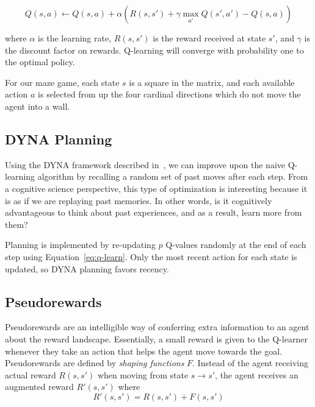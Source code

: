 \documentclass[notitlepage]{article}
\begin{document}
\begin{equation}
Q(s,a) \leftarrow Q(s,a) + \alpha (R(s, s') + \gamma \max_{a'} Q(s', a') - Q(s,a))
\label{eq:q-learn}
\end{equation}

where $\alpha$ is the learning rate, $R(s, s')$ is the reward received at state $s'$, and $\gamma$ is the discount factor on rewards. Q-learning will converge with probability one to the optimal policy. 

For our maze game, each state $s$ is a square in the matrix, and each available action $a$ is selected from up the four cardinal directions which do not move the agent into a wall. 

\subsection*{DYNA Planning}

Using the DYNA framework described in~\cite{sutton1998reinforcement}, we can improve upon the naive Q-learning algorithm by recalling a random set of past moves after each step. From a cognitive science perspective, this type of optimization is interesting because it is as if we are replaying past memories. In other words, is it cognitively advantageous to think about past experiences, and as a result, learn more from them? 

Planning is implemented by re-updating $p$ Q-values randomly at the end of each step using Equation~\ref{eq:q-learn}. Only the most recent action for each state is updated, so DYNA planning favors recency.

\subsection*{Pseudorewards}

Pseudorewards are an intelligible way of conferring extra information to an agent about the reward landscape. Essentially, a small reward is given to the Q-learner whenever they take an action that helps the agent move towards the goal. Pseudorewards are defined by \textit{shaping functions} $F$. Instead of the agent receiving actual reward $R(s, s')$ when moving from state $s \rightarrow s'$, the agent receives an augmented reward $R'(s, s')$ where
\begin{equation}
R'(s, s') = R(s, s') + F(s, s')
\end{equation} 
\end{document}
